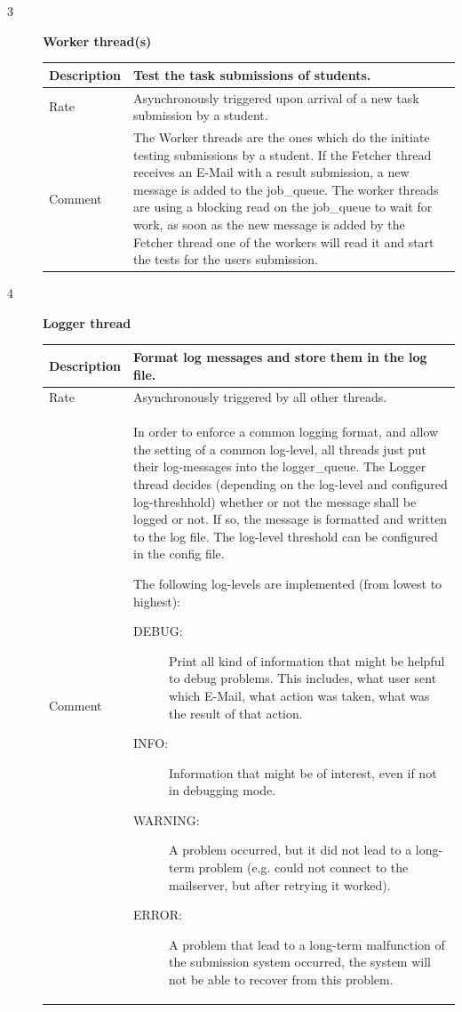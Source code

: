 \begin{description}
	\item [3] \textbf{Worker thread(s)} \\
    \begin{tabular}{|p{2cm}|p{11cm}|}
        \hline
        Description & Test the task submissions of students. \\
        \hline
        Rate & Asynchronously triggered upon arrival of a new task submission 
		by a student. \\
        \hline
        Comment & The Worker threads are the ones which do the initiate testing 
		submissions by a student. If the Fetcher thread receives an E-Mail with a result 
		submission, a new message is added to the job\_queue. The worker threads are 
		using a blocking read on the job\_queue to wait for work, as soon as the new 
		message is added by the Fetcher thread one of the workers will read it and 
		start the tests for the users submission.
        \\
        \hline
    \end{tabular}

    
	\item [4] \textbf{Logger thread}\label{sec:logger} \\
    \begin{tabular}{|p{2cm}|p{11cm}|}
        \hline
        Description & Format log messages and store them in the log file. \\
        \hline
        Rate & Asynchronously triggered by all other threads. \\
        \hline
		Comment & In order to enforce a common logging format, and allow the setting 
		of a common log-level, all threads just put their log-messages into the 
		logger\_queue. The Logger thread decides (depending on the log-level and configured 
		log-threshhold) whether or not the message shall be logged or not. If so, the message
		is formatted and written to the log file. The log-level threshold can be configured in the
		config file.

		The following log-levels are implemented (from lowest to highest):
        \begin{description}
		\item [DEBUG:] Print all kind of information that might be helpful to debug
			problems. This includes, what user sent which E-Mail, what action
			was taken, what was the result of that action.
		\item [INFO:] Information that might be of interest, even if not in debugging
			mode.
		\item [WARNING:] A problem occurred, but it did not lead to a long-term problem
			(e.g. could not connect to the mailserver, but after retrying it worked).
		\item [ERROR:] A problem that lead to a long-term malfunction of the submission
			system occurred, the system will not be able to recover from this problem.
		\end{description}
        \\
        \hline
    \end{tabular}


\end{description}
